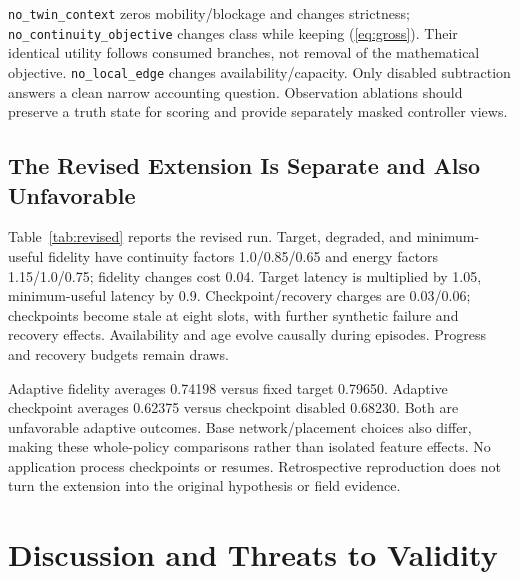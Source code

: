 \documentclass[letterpaper,journal]{IEEEtran}
\newcommand{\ArtifactRoot}{}
\newcommand{\pol}[1]{\texttt{#1}}
\begin{document}
\begin{table}[t]
\caption{Original procedural interventions. Several change scoring inputs and are not isolated observation ablations.}\label{tab:ablation}
\centering\small
\end{table}

\pol{no\_twin\_context} zeros mobility/blockage and changes strictness; \pol{no\_continuity\_objective} changes class while keeping (\ref{eq:gross}). Their identical utility follows consumed branches, not removal of the mathematical objective. \pol{no\_local\_edge} changes availability/capacity. Only disabled subtraction answers a clean narrow accounting question. Observation ablations should preserve a truth state for scoring and provide separately masked controller views.

\subsection{The Revised Extension Is Separate and Also Unfavorable}
Table~\ref{tab:revised} reports the revised run. Target, degraded, and minimum-useful fidelity have continuity factors 1.0/0.85/0.65 and energy factors 1.15/1.0/0.75; fidelity changes cost 0.04. Target latency is multiplied by 1.05, minimum-useful latency by 0.9. Checkpoint/recovery charges are 0.03/0.06; checkpoints become stale at eight slots, with further synthetic failure and recovery effects. Availability and age evolve causally during episodes. Progress and recovery budgets remain draws.

\begin{table}[t]
\caption{Revised held-out results, five seeds. Do not pool with Table~\ref{tab:heldout}.}\label{tab:revised}
\centering\scriptsize
\end{table}

Adaptive fidelity averages 0.74198 versus fixed target 0.79650. Adaptive checkpoint averages 0.62375 versus checkpoint disabled 0.68230. Both are unfavorable adaptive outcomes. Base network/placement choices also differ, making these whole-policy comparisons rather than isolated feature effects. No application process checkpoints or resumes. Retrospective reproduction does not turn the extension into the original hypothesis or field evidence.

\section{Discussion and Threats to Validity}
\end{document}
